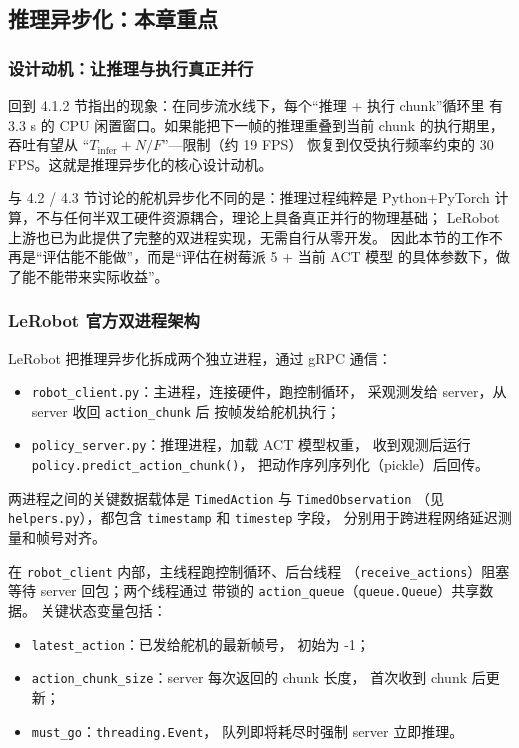 \subsection{推理异步化：本章重点}\label{sec:async-inference}

\subsubsection{设计动机：让推理与执行真正并行}\label{sec:async-inf-motivation}

回到 4.1.2 节指出的现象：在同步流水线下，每个``推理 + 执行 chunk''循环里
有 3.3 s 的 CPU 闲置窗口。如果能把下一帧的推理重叠到当前 chunk 的执行期里，
吞吐有望从 ``$T_{\text{infer}} + N/F$''---限制（约 19 FPS）
恢复到仅受执行频率约束的 30 FPS。这就是推理异步化的核心设计动机。

与 4.2 / 4.3 节讨论的舵机异步化不同的是：推理过程纯粹是 Python+PyTorch
计算，不与任何半双工硬件资源耦合，理论上具备真正并行的物理基础；
LeRobot 上游也已为此提供了完整的双进程实现，无需自行从零开发。
因此本节的工作不再是``评估能不能做''，而是``评估在树莓派 5 + 当前 ACT 模型
的具体参数下，做了能不能带来实际收益''。

\subsubsection{LeRobot 官方双进程架构}\label{sec:async-inf-arch}

LeRobot 把推理异步化拆成两个独立进程，通过 gRPC 通信：

\begin{itemize}[leftmargin=2em]
  \item \texttt{robot\_client.py}：主进程，连接硬件，跑控制循环，
        采观测发给 server，从 server 收回 \texttt{action\_chunk} 后
        按帧发给舵机执行；
  \item \texttt{policy\_server.py}：推理进程，加载 ACT 模型权重，
        收到观测后运行 \texttt{policy.predict\_action\_chunk()}，
        把动作序列序列化（pickle）后回传。
\end{itemize}

两进程之间的关键数据载体是 \texttt{TimedAction} 与 \texttt{TimedObservation}
（见 \texttt{helpers.py}），都包含 \texttt{timestamp} 和 \texttt{timestep} 字段，
分别用于跨进程网络延迟测量和帧号对齐。

在 \texttt{robot\_client} 内部，主线程跑控制循环、后台线程
（\texttt{receive\_actions}）阻塞等待 server 回包；两个线程通过
带锁的 \texttt{action\_queue}（\texttt{queue.Queue}）共享数据。
关键状态变量包括：
\begin{itemize}[leftmargin=2em]
  \item \texttt{latest\_action}：已发给舵机的最新帧号，
        初始为 -1；
  \item \texttt{action\_chunk\_size}：server 每次返回的 chunk 长度，
        首次收到 chunk 后更新；
  \item \texttt{must\_go}：\texttt{threading.Event}，
        队列即将耗尽时强制 server 立即推理。
\end{itemize}

